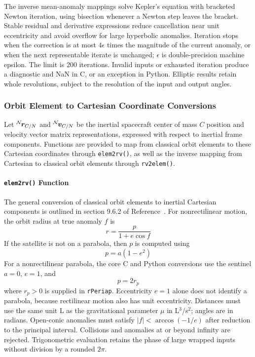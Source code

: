 The inverse mean-anomaly mappings solve Kepler's equation with bracketed Newton iteration, using bisection whenever a Newton step leaves the bracket. Stable residual and derivative expressions reduce cancellation near unit eccentricity and avoid overflow for large hyperbolic anomalies. Iteration stops when the correction is at most $4\epsilon$ times the magnitude of the current anomaly, or when the next representable iterate is unchanged; $\epsilon$ is double-precision machine epsilon. The limit is 200 iterations. Invalid inputs or exhausted iteration produce a diagnostic and NaN in C, or an exception in Python. Elliptic results retain whole revolutions, subject to the resolution of the input and output angles.




\subsubsection{Orbit Element to Cartesian Coordinate Conversions}
Let $\leftexp{N}{\bm r}_{C/N}$ and $\leftexp{N}{\bm v}_{C/N}$ be the inertial spacecraft center of mass $C$ position and velocity vector matrix representations, expressed with respect to inertial frame  components.  Functions are provided to map from classical orbit elements to these Cartesian coordinates through {\tt elem2rv()}, as well as the inverse mapping from Cartesian to classical orbit elements through {\tt rv2elem()}.

\paragraph{{\tt elem2rv()} Function}
The general conversion of classical orbit elements to inertial Cartesian components is outlined in section 9.6.2 of Reference~. For nonrectilinear motion, the orbit radius at true anomaly $f$ is
\begin{equation}
	r = \frac{p}{1 + e \cos f}
\end{equation}
If the satellite is not on a parabola, then $p$ is computed using
\begin{equation}
	p = a(1-e^{2})
\end{equation}
For a nonrectilinear parabola, the core C and Python conversions use the sentinel $a=0$, $e=1$, and
\begin{equation}
	p = 2r_{p}
\end{equation}
where $r_{p}>0$ is supplied in {\tt rPeriap}. Eccentricity $e=1$ alone does not identify a parabola, because rectilinear motion also has unit eccentricity. Distances must use the same unit L as the gravitational parameter $\mu$ in L$^3$/s$^2$; angles are in radians. Open-conic anomalies must satisfy $|f|<\arccos(-1/e)$ after reduction to the principal interval. Collisions and anomalies at or beyond infinity are rejected. Trigonometric evaluation retains the phase of large wrapped inputs without division by a rounded $2\pi$.

